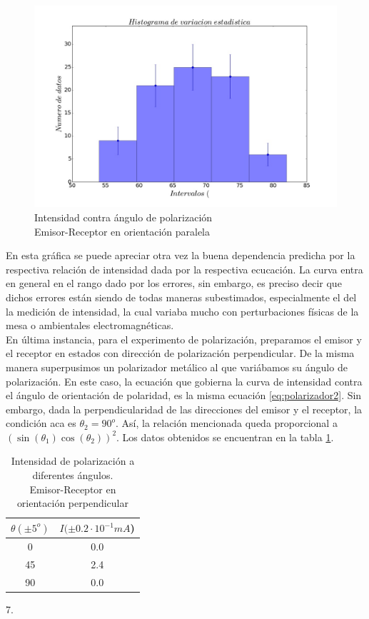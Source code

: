 \documentclass[%
 reprint,
 amsmath,amssymb,
 aps,
]{revtex4-1}
\begin{document}
\begin{figure}[h!]
\centering
\includegraphics[width=0.8\linewidth]{polarizador2}
\caption{Intensidad contra ángulo de polarización \\ Emisor-Receptor en orientación paralela}
\label{fig:polarizador2}
\end{figure}

En esta gráfica se puede apreciar otra vez la buena dependencia predicha por la respectiva relación de intensidad dada por la respectiva ecucación. La curva entra en general en el rango dado por los errores, sin embargo, es preciso decir que dichos errores están siendo de todas maneras subestimados, especialmente el del la medición de intensidad, la cual variaba mucho con perturbaciones físicas de la mesa o ambientales electromagnéticas.\\

En última instancia, para el experimento de polarización, preparamos el emisor y el receptor en estados con dirección de polarización perpendicular. De la misma manera superpusimos un polarizador metálico al que variábamos su ángulo de polarización. En este caso, la ecuación que gobierna la curva de intensidad contra el ángulo de orientación de polaridad, es la misma ecuación \ref{eq:polarizador2}. Sin embargo, dada la perpendicularidad de las direcciones del emisor y el receptor, la condición aca es $\theta_2 = 90^o$. Así, la relación mencionada queda proporcional a $\left(\sin{(\theta_1)}\cos{(\theta_2)}\right)^2$. Los datos obtenidos se encuentran en la tabla \ref{table:polarizador3}.\\

\begin{table}[h!]
\centering
\begin{tabular}{|c|c|}
	\hline $ \theta (\pm 5^o) $ & $ I(\pm 0.2\cdot 10^{-1}mA  $)  \\ 
	\hline\hline
	0  &  0.0\\
	45 &  2.4\\ 
	90 &  0.0\\ 
	[1ex] 
 \hline
 \end{tabular} 
  \caption{Intensidad de polarización a diferentes ángulos.\\ Emisor-Receptor en orientación perpendicular}
\label{table:polarizador3} 7.
\end{table}
\end{document}
